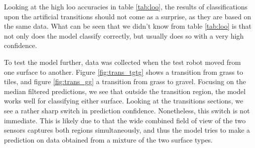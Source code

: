 Looking at the high \gls{loo} accuracies in table \ref{tab:loo}, the results of classifications upon the artificial transitions should not come as a surprise, as they are based on the same data. What can be seen that we didn't know from table \ref{tab:loo} is that not only does the model classify correctly, but usually  does so with a very high confidence. 

To test the model further, data was collected when the test robot moved from one surface to another. Figure \ref{fig:trans_tgtg} shows a transition from grass to tiles, and figure \ref{fig:trans_gg} a transition from grass to gravel. Focusing on the median filtered predictions, we see that outside the transition region, the model works well for classifying either surface. Looking at the transitions sections, we see a rather sharp switch in prediction confidence. Nonetheless, this switch is not immediate. This is likely due to that the wide combined field of view of the two sensors captures both regions simultaneously, and thus the model tries to make a prediction on data obtained from a mixture of the two surface types. 


